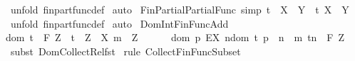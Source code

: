 \begin{isabellebody}
%
\isadelimproof
%
\endisadelimproof
%
\isatagproof
{}\isamarkupfalse%
\ {\isacharparenleft}unfold\ fin{\isacharunderscore}part{\isacharunderscore}func{\isacharunderscore}def{\isacharparenright}\isanewline
{}\isamarkupfalse%
\ auto\isanewline
{}\isamarkupfalse%
%
\endisatagproof
{\isafoldproof}%
%
\isadelimproof
\isanewline
%
\endisadelimproof
\isanewline
{}\isamarkupfalse%
\ Fin{\isacharunderscore}Partial{\isacharunderscore}Partial{\isacharunderscore}Func\ {\isacharbrackleft}simp{\isacharbrackright}{\isacharcolon}\ {\isachardoublequoteopen}t\ {\isacharcolon}\ {\isacharparenleft}X\ {\isacharminus}{\isacharbar}{\isacharbar}{\isacharminus}{\isachargreater}\ Y{\isacharparenright}\ {\isacharequal}{\isacharequal}{\isachargreater}\ t{\isacharcolon}\ {\isacharparenleft}X\ {\isacharminus}{\isacharbar}{\isacharminus}{\isachargreater}\ Y{\isacharparenright}{\isachardoublequoteclose}\isanewline
%
\isadelimproof
%
\endisadelimproof
%
\isatagproof
{}\isamarkupfalse%
\ {\isacharparenleft}unfold\ fin{\isacharunderscore}part{\isacharunderscore}func{\isacharunderscore}def{\isacharparenright}\isanewline
{}\isamarkupfalse%
\ auto\isanewline
{}\isamarkupfalse%
%
\endisatagproof
{\isafoldproof}%
%
\isadelimproof
\isanewline
%
\endisadelimproof
\isanewline
\isanewline
{}\isamarkupfalse%
\ Dom{\isacharunderscore}Int{\isacharunderscore}Fin{\isacharunderscore}Func{\isacharunderscore}Add{\isacharcolon}\ \isanewline
{\isachardoublequoteopen}{\isacharbrackleft}{\isacharbar}dom\ t\ {\isacharcolon}\ {\isacharpercent}F\ {\isacharpercent}Z\ {\isacharsemicolon}\ t\ {\isacharcolon}\ {\isacharparenleft}{\isacharpercent}Z\ {\isacharminus}{\isacharbar}{\isacharminus}{\isachargreater}\ X{\isacharparenright}{\isacharsemicolon}\ m\ {\isacharcolon}\ {\isacharpercent}Z{\isacharbar}{\isacharbrackright}\ {\isacharequal}{\isacharequal}{\isachargreater}\ \ \isanewline
\ \ \ dom\ {\isacharbraceleft}p{\isachardot}\ EX\ n{\isacharcolon}dom\ t{\isachardot}\ p\ {\isacharequal}\ {\isacharparenleft}n\ {\isacharplus}\ m{\isacharcomma}\ t{\isacharpercent}{\isacharcircum}n{\isacharparenright}{\isacharbraceright}\ {\isacharcolon}\ {\isacharpercent}F\ {\isacharpercent}Z{\isachardoublequoteclose}\isanewline
%
\isadelimproof
%
\endisadelimproof
%
\isatagproof
{}\isamarkupfalse%
\ {\isacharparenleft}subst\ Dom{\isacharunderscore}Collect{\isacharunderscore}Rel{\isacharunderscore}fst{\isacharparenright}\isanewline
{}\isamarkupfalse%
\ {\isacharparenleft}rule\ Collect{\isacharunderscore}Fin{\isacharunderscore}Func{\isacharunderscore}Subset{\isacharparenright}\isanewline

\end{isabellebody}
